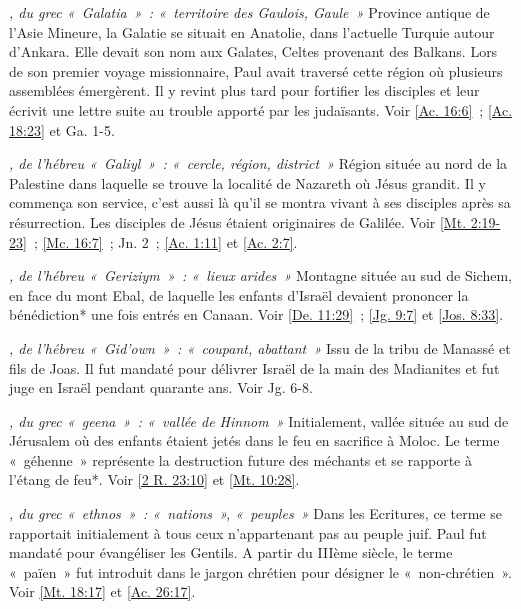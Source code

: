 \begin{multicols}{2}
\textit{, du grec «~Galatia~»~: «~territoire des Gaulois, Gaule~»}\newline
Province antique de l'Asie Mineure, la Galatie se situait en Anatolie, dans l'actuelle Turquie autour d'Ankara. Elle devait son nom aux Galates, Celtes provenant des Balkans. Lors de son premier voyage missionnaire, Paul avait traversé cette région où plusieurs assemblées émergèrent. Il y revint plus tard pour fortifier les disciples et leur écrivit une lettre suite au trouble apporté par les judaïsants. Voir \vref{Ac. 16:6}~; \vref{Ac. 18:23} et Ga. 1-5.

\textit{, de l'hébreu «~Galiyl~»~: «~cercle, région, district~»}\newline
Région située au nord de la Palestine dans laquelle se trouve la localité de Nazareth où Jésus grandit. Il y commença son service, c'est aussi là qu'il se montra vivant à ses disciples après sa résurrection. Les disciples de Jésus étaient originaires de Galilée. Voir \vref{Mt. 2:19-23}~; \vref{Mc. 16:7}~; Jn. 2~; \vref{Ac. 1:11} et \vref{Ac. 2:7}.

\textit{, de l'hébreu «~Geriziym~»~: «~lieux arides~»}\newline
Montagne située au sud de Sichem, en face du mont Ebal, de laquelle les enfants d'Israël devaient prononcer la bénédiction* une fois entrés en Canaan. Voir \vref{De. 11:29}~; \vref{Jg. 9:7} et \vref{Jos. 8:33}.

\textit{, de l'hébreu «~Gid'own~»~: «~coupant, abattant~»}\newline
Issu de la tribu de Manassé et fils de Joas. Il fut mandaté pour délivrer Israël de la main des Madianites et fut juge en Israël pendant quarante ans. Voir Jg. 6-8.

\textit{, du grec «~geena~»~: «~vallée de Hinnom~»}\newline
Initialement, vallée située au sud de Jérusalem où des enfants étaient jetés dans le feu en sacrifice à Moloc. Le terme «~géhenne~» représente la destruction future des méchants et se rapporte à l'étang de feu*. Voir \vref{2 R. 23:10} et \vref{Mt. 10:28}.

\textit{, du grec «~ethnos~»~: «~nations~», «~peuples~»}\newline
Dans les Ecritures, ce terme se rapportait initialement à tous ceux n'appartenant pas au peuple juif. Paul fut mandaté pour évangéliser les Gentils. A partir du IIIème siècle, le terme «~païen~» fut introduit dans le jargon chrétien pour désigner le «~non-chrétien~». Voir \vref{Mt. 18:17} et \vref{Ac. 26:17}.


\end{multicols}
